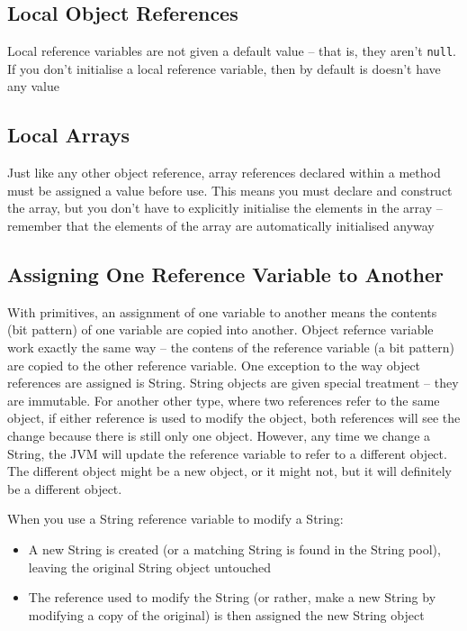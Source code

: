\subsection{Local Object References}
Local reference variables are not given a default value -- that is, they aren't 
\verb#null#. If you don't initialise a local reference variable, then by 
default is doesn't have any value

\subsection{Local Arrays}
Just like any other object reference, array references declared within a method 
must be assigned a value before use. This means you must declare and construct 
the array, but you don't have to explicitly initialise the elements in the
array -- remember that the elements of the array are automatically initialised 
anyway

\subsection{Assigning One Reference Variable to Another}
With primitives, an assignment of one variable to another means the contents 
(bit pattern) of one variable are copied into another. Object refernce variable 
work exactly the same way -- the contens of the reference variable (a bit 
pattern) are copied to the other reference variable. One exception to the way 
object references are assigned is String. String objects are given special 
treatment -- they are immutable. For another other type, where two references 
refer to the same object, if either reference is used to modify the object, 
both references will see the change because there is still only one object.  
However, any time we change a String, the JVM will update the reference 
variable to refer to a different object. The different object might be a new 
object, or it might not, but it will definitely be a different object.

When you use a String reference variable to modify a String:
\begin{itemize}
    \item A new String is created (or a matching String is found in the String 
    pool), leaving the original String object untouched
    \item The reference used to modify the String (or rather, make a new String 
    by modifying a copy of the original) is then assigned the new String object
\end{itemize}

